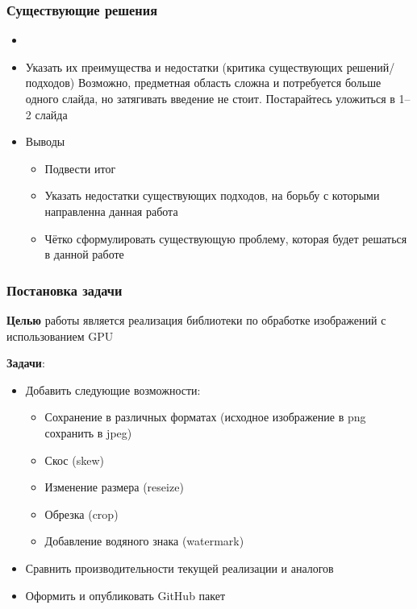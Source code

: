 \documentclass[aspectratio=169]{beamer}
\begin{document}
\begin{frame}  
  \frametitle{Существующие решения}
  
  \begin{itemize}
    \item
    \item Указать их преимущества и недостатки (критика существующих решений/подходов)  
     Возможно, предметная область сложна и потребуется больше одного слайда, но затягивать введение не стоит. Постарайтесь уложиться в 1--2 слайда
  \end{itemize}
  \begin{itemize}
    \item Выводы
    \begin{itemize}
      \item Подвести итог
      \item Указать недостатки существующих подходов, на борьбу с которыми 
направленна данная работа
      \item Чётко сформулировать существующую проблему, которая будет решаться в данной работе
  \end{itemize}
  \end{itemize}
    
\end{frame}

\begin{frame}
  \frametitle{Постановка задачи}
  \textbf{Целью} работы является реализация библиотеки по обработке изображений с использованием GPU %
  
  \textbf{Задачи}:
  \begin{itemize}
    \item Добавить следующие возможности:
    \begin{itemize}
        \item Сохранение в различных форматах (исходное изображение в png сохранить в jpeg)
        \item Скос (skew)
        \item Изменение размера (reseize)
        \item Обрезка (crop)
        \item Добавление водяного знака (watermark)
    \end{itemize}
    \item Сравнить производительности текущей реализации и аналогов 
    \item Оформить и опубликовать GitHub пакет
  \end{itemize}
\end{frame}
            
\end{document}

